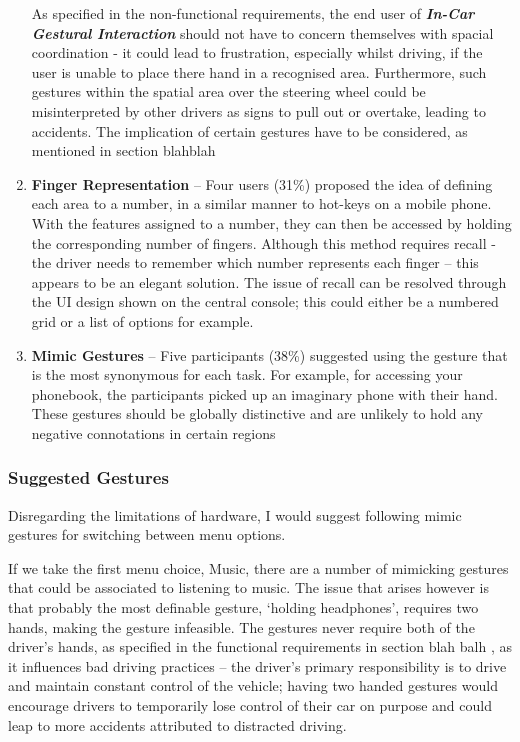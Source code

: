 \documentclass{l4proj}
\begin{document}
\begin{enumerate}
As specified in the non-functional requirements, the end user of \textbf{\textit{In-Car Gestural Interaction}} should not have to concern themselves with spacial coordination - it could lead to frustration, especially whilst driving, if the user is unable to place there hand in a recognised area. 
Furthermore, such gestures within the spatial area over the steering wheel could be misinterpreted by other drivers as signs to pull out or overtake, leading to accidents. The implication of certain gestures have to be considered, as mentioned in section blahblah\cite{}

\item \textbf{Finger Representation} -- Four users (31\%) proposed the idea of defining each area to a number, in a similar manner to hot-keys on a mobile phone. With the features assigned to a number, they can then be accessed by holding the corresponding number of fingers. Although this method requires recall - the driver needs to remember which number represents each finger – this appears to be an elegant solution. The issue of recall can be resolved through the UI design shown on the central console; this could either be a numbered grid or a list of options for example.

\item \textbf{Mimic Gestures} -- Five participants (38\%) suggested using the gesture that is the most synonymous for each task. For example, for accessing your phonebook, the participants picked up an imaginary phone with their hand. These gestures should be globally distinctive and are unlikely to hold any negative connotations in certain regions
\end{enumerate}

\subsubsection{Suggested Gestures}
\vspace{-3mm}
Disregarding the limitations of hardware, I would suggest following mimic gestures for switching between menu options.

If we take the first menu choice, Music, there are a number of mimicking gestures that could be associated to listening to music. The issue that arises however is that probably the most definable gesture, `holding headphones', requires two hands, making the gesture infeasible. The gestures never require both of the driver's hands, as specified in the functional requirements in section blah balh \cite{}, as it influences bad driving practices -- the driver’s primary responsibility is to drive and maintain constant control of the vehicle; having two handed gestures would encourage drivers to temporarily lose control of their car on purpose and could leap to more accidents attributed to distracted driving.
\end{document}
